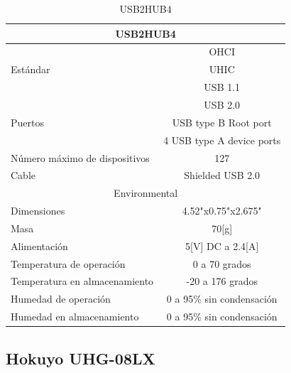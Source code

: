 \documentclass[a4paper]{book}
\begin{document}
\begin{table}[H]
\begin{center}
\begin{tabular}{|l|l|}%


\hline
\multicolumn{2}{|c|}{USB2HUB4} \\ \hline %
\multirow{3}{1cm}{Estándar} & \multicolumn{1}{|c|}{OHCI}\\ & \multicolumn{1}{|c|}{UHIC}\\ & \multicolumn{1}{|c|}{USB 1.1}\\ & \multicolumn{1}{|c|}{USB 2.0}\\ \hline
Puertos & \multicolumn{1}{|c|}{USB type B Root port}\\ &\multicolumn{1}{|c|}{4 USB type A device ports}\\ \hline
Número máximo de dispositivos & \multicolumn{1}{|c|}{127}\\ \hline
Cable & \multicolumn{1}{|c|}{Shielded USB 2.0}\\ \hline
\multicolumn{2}{|c|}{Environmental}\\ \hline
Dimensiones & \multicolumn{1}{|c|}{4.52"x0.75"x2.675"}\\ \hline
Masa & \multicolumn{1}{|c|}{70[g]}\\ \hline
Alimentación & \multicolumn{1}{|c|}{5[V] DC a 2.4[A]}\\ \hline
Temperatura de operación & \multicolumn{1}{|c|}{0 a 70 grados}\\ \hline
Temperatura en almacenamiento & \multicolumn{1}{|c|}{-20 a 176 grados}\\ \hline
Humedad de operación & \multicolumn{1}{|c|}{0 a 95\% sin condensación}\\ \hline
Humedad en almacenamiento & \multicolumn{1}{|c|}{0 a 95\% sin condensación}\\ \hline

\end{tabular}
\caption{USB2HUB4}
\label{Datos del USB2HUB4}
\end{center}
\end{table}

\subsection{Hokuyo UHG-08LX}
\end{document}
